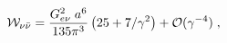 \begin{equation}
{\cal W}_{\nu {\bar \nu}}=
\frac{G_{e\nu}^2\;a^6}{135 \pi^3} 
\left( 
25 + 7/\gamma^2
\right)
+
{\cal O} (\gamma^{-4})
\;,
\label{WNU}
\end{equation}

